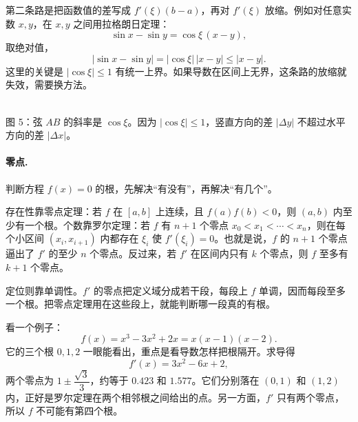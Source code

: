 第二条路是把函数值的差写成 $f'(\xi)(b-a)$，再对 $f'(\xi)$ 放缩。例如对任意实数 $x,y$，在 $x,y$ 之间用拉格朗日定理：
\[
\sin x-\sin y=\cos\xi\,(x-y),
\]
取绝对值，
\[
|\sin x-\sin y|=|\cos\xi|\,|x-y|\le |x-y|.
\]
这里的关键是 $|\cos\xi|\le1$ 有统一上界。如果导数在区间上无界，这条路的放缩就失效，需要换方法。

\begin{center}
\\[2pt]
{\footnotesize 图 5：弦 $AB$ 的斜率是 $\cos\xi$。因为 $|\cos\xi|\le1$，竖直方向的差 $|\Delta y|$ 不超过水平方向的差 $|\Delta x|$。}
\end{center}

\paragraph{零点.} 判断方程 $f(x)=0$ 的根，先解决“有没有”，再解决“有几个”。

存在性靠零点定理：若 $f$ 在 $[a,b]$ 上连续，且 $f(a)f(b)<0$，则 $(a,b)$ 内至少有一个根。个数靠罗尔定理：若 $f$ 有 $n+1$ 个零点 $x_0<x_1<\cdots<x_n$，则在每个小区间 $(x_i,x_{i+1})$ 内都存在 $\xi_i$ 使 $f'(\xi_i)=0$。也就是说，$f$ 的 $n+1$ 个零点逼出了 $f'$ 的至少 $n$ 个零点。反过来，若 $f'$ 在区间内只有 $k$ 个零点，则 $f$ 至多有 $k+1$ 个零点。

定位则靠单调性。$f'$ 的零点把定义域分成若干段，每段上 $f$ 单调，因而每段至多一个根。把零点定理用在这些段上，就能判断哪一段真的有根。

看一个例子：
\[
f(x)=x^3-3x^2+2x=x(x-1)(x-2).
\]
它的三个根 $0,1,2$ 一眼能看出，重点是看导数怎样把根隔开。求导得
\[
f'(x)=3x^2-6x+2,
\]
两个零点为 $1\pm\dfrac{\sqrt3}{3}$，约等于 $0.423$ 和 $1.577$。它们分别落在 $(0,1)$ 和 $(1,2)$ 内，正好是罗尔定理在两个相邻根之间给出的点。另一方面，$f'$ 只有两个零点，所以 $f$ 不可能有第四个根。

